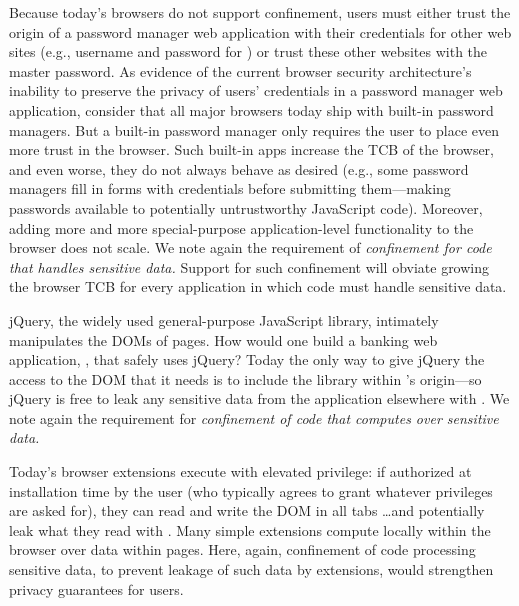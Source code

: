 %
%
Because today's browsers do not support confinement, users must either
trust the origin of a password manager web application with their
credentials for other web sites (e.g., username and password for
) or trust these other websites with the master
password.
%
As evidence of the current browser security architecture's inability
to preserve the privacy of users' credentials in a password manager
web application, consider that all major browsers today ship with
built-in password managers.
%
But a built-in password manager only requires the user to place even
more trust in the browser.
%
Such built-in apps increase the TCB of the browser, and even worse,
they do not always behave as desired (e.g., some password managers
fill in forms with credentials before submitting them---making
passwords available to potentially untrustworthy JavaScript code).
%
Moreover, adding more and more special-purpose application-level
functionality to the browser does not scale. We note again the
requirement of {\em confinement for code that handles sensitive data.}
Support for such confinement will obviate growing the browser TCB for
every application in which code must handle sensitive data.

jQuery, the widely used general-purpose JavaScript library, intimately
manipulates the DOMs of pages. How would one build a banking web
application, , that safely uses jQuery? Today the only
way to give jQuery the access to the DOM that it needs is to include
the library within 's origin---so jQuery is free to
leak any sensitive data from the application elsewhere with \xhr{}.
We note again the requirement for {\em confinement of code that
  computes over sensitive data.}

 Today's browser extensions execute with
elevated privilege: if authorized at installation time by the user
(who typically agrees to grant whatever privileges are asked for),
they can read and write the DOM in all tabs \ldots and potentially
leak what they read with \xhr{}. Many simple extensions compute
locally within the browser over data within pages. Here, again,
confinement of code processing sensitive data, to prevent leakage of
such data by extensions, would strengthen privacy guarantees for
users.

